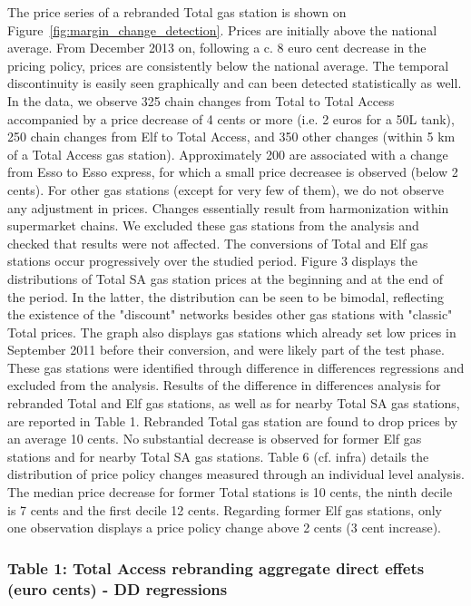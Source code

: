 \documentclass[english]{article}
\begin{document}
The price series of a rebranded Total gas station is shown on Figure~\ref{fig:margin_change_detection}. Prices are initially above the national average. From December 2013 on,
following a c. 8 euro cent decrease in the pricing policy, prices are consistently below the national average. The temporal discontinuity is easily seen graphically and can been detected statistically as well. In the data, we observe 325 chain changes from Total to Total Access accompanied by a price decrease of 4 cents or more (i.e. 2 euros for a 50L tank), 250 chain changes from Elf to Total Access, and 350 other changes (within 5 km of a Total Access gas station). Approximately 200  are associated with a change from Esso to Esso express, for which a small price decreasee is observed (below 2 cents). For other gas
stations (except for very few of them), we do not observe any adjustment in prices. Changes essentially result from harmonization within supermarket chains. We excluded these gas stations from the analysis and checked that results were not affected. The conversions of Total and Elf gas stations occur progressively over the studied period. Figure 3 displays the distributions of Total SA gas station prices at the beginning and at the end of the period. In the latter, the distribution can be seen to be bimodal, reflecting the existence of the "discount" networks besides other gas stations with "classic" Total prices. The graph also displays gas stations which already set low prices in September 2011 before their conversion, and were likely part of the test phase. These gas stations were identified through difference in differences regressions and excluded from the analysis. Results of the difference in differences analysis for rebranded Total
and Elf gas stations, as well as for nearby Total SA gas stations, are reported in Table 1. Rebranded Total gas station are found to drop prices by an average 10 cents. No substantial decrease is observed for former Elf gas stations and for nearby Total SA gas
stations. Table 6 (cf. infra) details the distribution of price policy changes measured through an individual level analysis. The median price decrease for former Total stations is 10 cents, the ninth decile is 7 cents and the first decile 12 cents. Regarding former Elf gas stations, only one observation displays a price policy change above 2 cents (3 cent increase).

\subsubsection*{Table 1: Total Access rebranding aggregate direct effets (euro cents) - DD regressions}
\end{document}
